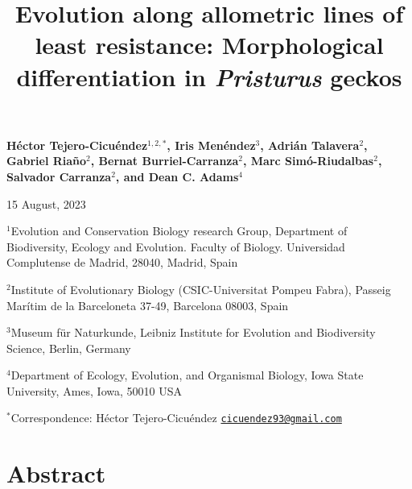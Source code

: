 \documentclass[
  11pt,
]{article}
\title{Evolution along allometric lines of least resistance:
Morphological differentiation in \emph{Pristurus} geckos}
\author{}
\date{\vspace{-2.5em}}
\begin{document}
\maketitle

\begin{center}
\textbf{H{\'{e}}ctor Tejero-Cicu{\'{e}}ndez$^{1,2,*}$,  Iris Men{\'{e}}ndez$^{3}$, Adri{\'{a}}n Talavera$^{2}$, Gabriel Riaño$^{2}$, Bernat Burriel-Carranza$^{2}$, Marc Sim{\'{o}}-Riudalbas$^{2}$, Salvador Carranza$^{2}$, and Dean C. Adams$^{4}$}
\end{center}

\begin{center}15 August, 2023\end{center}

\(^{1}\)Evolution and Conservation Biology research Group, Department of
Biodiversity, Ecology and Evolution. Faculty of Biology. Universidad
Complutense de Madrid, 28040, Madrid, Spain

\(^{2}\)Institute of Evolutionary Biology (CSIC-Universitat Pompeu
Fabra), Passeig Marítim de la Barceloneta 37-49, Barcelona 08003, Spain

\(^{3}\)Museum für Naturkunde, Leibniz Institute for Evolution and
Biodiversity Science, Berlin, Germany

\(^{4}\)Department of Ecology, Evolution, and Organismal Biology, Iowa
State University, Ames, Iowa, 50010 USA

\(^{*}\)Correspondence: Héctor Tejero-Cicuéndez
\href{mailto:cicuendez93@gmail.com}{\nolinkurl{cicuendez93@gmail.com}}

\newpage

\hypertarget{abstract}{%
\section{Abstract}\label{abstract}}
\end{document}
